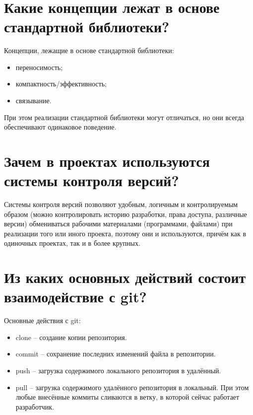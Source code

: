 \documentclass[a4paper,12pt]{article}	%
\title{
	\center{\textbf{Контрольные вопросы. Задание 13.}}
	}
\begin{document}

\maketitle

\section{Какие концепции лежат в основе стандартной библиотеки?}
	
	Концепции, лежащие в основе стандартной библиотеки:
	
	\begin{itemize}
	
		\item переносимость;
		
		\item компактность/эффективность;
		
		\item связывание.
	
	\end{itemize}
	
	При этом реализации стандартной библиотеки могут отличаться, но они всегда обеспечивают одинаковое поведение.
		
\newpage

\section{Зачем в проектах используются системы контроля версий?}

	Системы контроля версий позволяют удобным, логичным и контролируемым образом (можно контролировать историю разработки, права доступа, различные версии) обмениваться рабочими материалами (программами, файлами) при реализации того или иного проекта, поэтому они и используются, причём как в одиночных проектах, так и в более крупных.
	
\newpage

\section{Из каких основных действий состоит взаимодействие с git?}
	
	Основные действия с git:
	
	\begin{itemize}
	
		\item clone -- создание копии репозитория.
		
		\item commit -- сохранение последних изменений файла в репозитории.
		
		\item push -- загрузка содержимого локального репозитория в удалённый.
		
		\item pull -- загрузка содержимого удалённого репозитория в локальный. При этом любые внесённые коммиты сливаются в ветку, в которой сейчас работает разработчик.
	
	\end{itemize}
	
\end{document}
